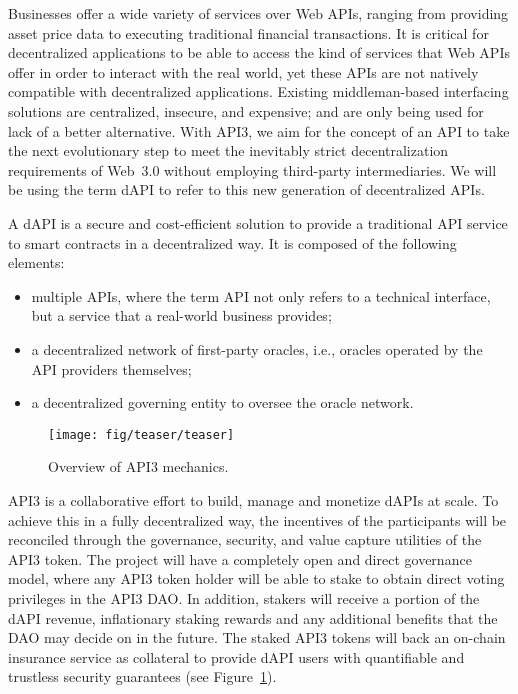\documentclass[11pt]{article}
\begin{document}
Businesses offer a wide variety of services over Web APIs, ranging from providing asset price data to executing traditional financial transactions.
It is critical for decentralized applications to be able to access the kind of services that Web APIs offer in order to interact with the real world, yet these APIs are not natively compatible with decentralized applications.
Existing middleman-based interfacing solutions are centralized, insecure, and expensive; and are only being used for lack of a better alternative.
With API3, we aim for the concept of an API to take the next evolutionary step to meet the inevitably strict decentralization requirements of Web~3.0 without employing third-party intermediaries.
We will be using the term dAPI to refer to this new generation of decentralized APIs.

A dAPI is a secure and cost-efficient solution to provide a traditional API service to smart contracts in a decentralized way.
It is composed of the following elements:
\begin{itemize}
    \item multiple APIs, where the term API not only refers to a technical interface, but a service that a real-world business provides;
    \item a decentralized network of first-party oracles, i.e., oracles operated by the API providers themselves;
    \item a decentralized governing entity to oversee the oracle network.
\end{itemize}

\begin{figure}[!t]
    \centering
    \texttt{[image: fig/teaser/teaser]}
	\caption{Overview of API3 mechanics.}
	\label{fig:teaser}
\end{figure}

API3 is a collaborative effort to build, manage and monetize dAPIs at scale.
To achieve this in a fully decentralized way, the incentives of the participants will be reconciled through the governance, security, and value capture utilities of the API3 token.
The project will have a completely open and direct governance model, where any API3 token holder will be able to stake to obtain direct voting privileges in the API3 DAO.
In addition, stakers will receive a portion of the dAPI revenue, inflationary staking rewards and any additional benefits that the DAO may decide on in the future.
The staked API3 tokens will back an on-chain insurance service as collateral to provide dAPI users with quantifiable and trustless security guarantees (see Figure~\ref{fig:teaser}).
\end{document}
